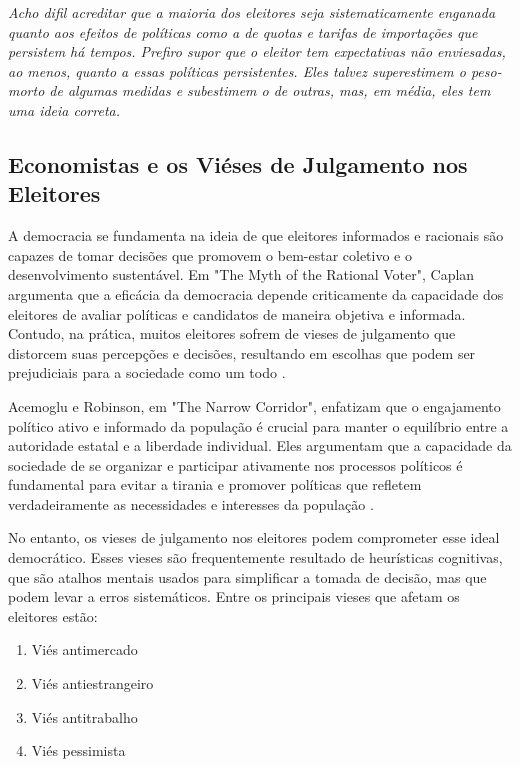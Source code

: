 \begin{citacao}
    \textit{Acho difil acreditar que a maioria dos eleitores seja sistematicamente enganada quanto aos efeitos de políticas como a de quotas e tarifas de importações que persistem há tempos. Prefiro supor que o eleitor tem expectativas não enviesadas, ao menos, quanto a essas políticas persistentes. Eles talvez superestimem o peso-morto de algumas medidas e subestimem o de outras, mas, em média, eles tem uma ideia correta.
    } \newline \cite{becker1976}
\end{citacao}

\subsection{Economistas e os Viéses de Julgamento nos Eleitores}

A democracia se fundamenta na ideia de que eleitores informados e racionais são capazes de tomar decisões que promovem o bem-estar coletivo e o desenvolvimento sustentável. Em "The Myth of the Rational Voter", Caplan argumenta que a eficácia da democracia depende criticamente da capacidade dos eleitores de avaliar políticas e candidatos de maneira objetiva e informada. Contudo, na prática, muitos eleitores sofrem de vieses de julgamento que distorcem suas percepções e decisões, resultando em escolhas que podem ser prejudiciais para a sociedade como um todo \cite{The_Myth_of_the_Rational_Voter}.

Acemoglu e Robinson, em "The Narrow Corridor", enfatizam que o engajamento político ativo e informado da população é crucial para manter o equilíbrio entre a autoridade estatal e a liberdade individual. Eles argumentam que a capacidade da sociedade de se organizar e participar ativamente nos processos políticos é fundamental para evitar a tirania e promover políticas que refletem verdadeiramente as necessidades e interesses da população \cite{acemoglu2019narrow}.

No entanto, os vieses de julgamento nos eleitores podem comprometer esse ideal democrático. Esses vieses são frequentemente resultado de heurísticas cognitivas, que são atalhos mentais usados para simplificar a tomada de decisão, mas que podem levar a erros sistemáticos. Entre os principais vieses que afetam os eleitores estão:

\begin{enumerate}
    \item Viés antimercado
    \item Viés antiestrangeiro
    \item Viés antitrabalho
    \item Viés pessimista
\end{enumerate}

